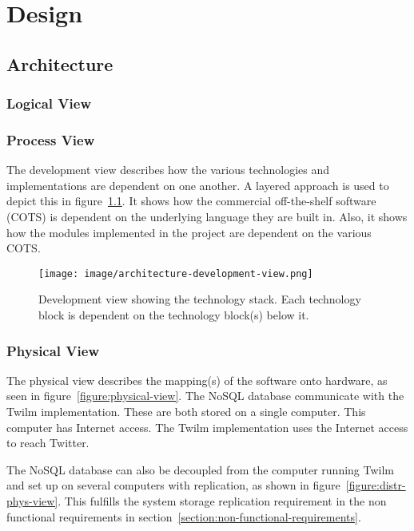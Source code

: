 
\chapter{Design}
\minitoc

\clearpage

\section{Architecture}

\subsection{Logical View}

\subsection{Process View}
The development view describes how the various technologies and implementations are dependent on one another. A layered approach is used to depict this in figure~\ref{figure:development-view}. It shows how the commercial off-the-shelf software (COTS) is dependent on the underlying language they are built in. Also, it shows how the modules implemented in the project are dependent on the various COTS.

\begin{figure}[H]
    \centerline{\texttt{[image: image/architecture-development-view.png]}}
    \caption[Development view]{Development view showing the technology stack. Each technology block is dependent on the technology block(s) below it.}
    \label{figure:development-view}
\end{figure}

\subsection{Physical View}
The physical view describes the mapping(s) of the software onto hardware, as seen in figure~\ref{figure:physical-view}. The NoSQL database communicate with the Twilm implementation. These are both stored on a single computer. This computer has Internet access. The Twilm implementation uses the Internet access to reach Twitter.

The NoSQL database can also be decoupled from the computer running Twilm and set up on several computers with replication, as shown in figure~\ref{figure:distr-phys-view}. This fulfills the system storage replication requirement in the non functional requirements in section~\ref{section:non-functional-requirements}.

